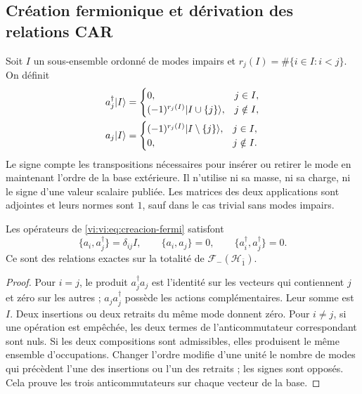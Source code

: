 \subsection{Création fermionique et dérivation des relations CAR}
\label{vi:vi:subsec:car-construccion}

Soit \(I\) un sous-ensemble ordonné de modes impairs et
\(r_j(I)=\#\{i\in I:i<j\}\). On définit
\begin{align}
 a_j^\dagger|I\rangle&=
 \begin{cases}
 0,&j\in I,\\
 (-1)^{r_j(I)}|I\cup\{j\}\rangle,&j\notin I,
 \end{cases}\notag\\
 a_j|I\rangle&=
 \begin{cases}
 (-1)^{r_j(I)}|I\setminus\{j\}\rangle,&j\in I,\\
 0,&j\notin I.
 \end{cases}
 \label{vi:vi:eq:creacion-fermi}
\end{align}
Le signe compte les transpositions nécessaires pour insérer ou retirer
le mode en maintenant l'ordre de la base extérieure. Il n'utilise ni sa masse,
ni sa charge, ni le signe d'une valeur scalaire publiée. Les matrices des
deux applications sont adjointes et leurs normes sont \(1\), sauf dans le
cas trivial sans modes impairs.

\begin{theorem}
\label{vi:vi:thm:car-construidas}
Les opérateurs de \eqref{vi:vi:eq:creacion-fermi} satisfont
\[
 \{a_i,a_j^\dagger\}=\delta_{ij}I,\qquad
 \{a_i,a_j\}=0,\qquad
 \{a_i^\dagger,a_j^\dagger\}=0.
\]
Ce sont des relations exactes sur la totalité de
\(\mathcal F_-(\mathcal H_{\bar1})\).
\end{theorem}
\begin{proof}
Pour \(i=j\), le produit \(a_j^\dagger a_j\) est l’identité
sur les vecteurs qui contiennent \(j\) et zéro sur les autres ;
\(a_ja_j^\dagger\) possède les actions complémentaires. Leur somme
est \(I\). Deux insertions ou deux retraits du même mode donnent zéro.
Pour \(i\ne j\), si une opération est empêchée, les deux termes
de l’anticommutateur correspondant sont nuls. Si les deux compositions
sont admissibles, elles produisent le même ensemble d’occupations. Changer
l’ordre modifie d’une unité le nombre de modes qui précèdent
l’une des insertions ou l’un des retraits ; les signes sont opposés. Cela
prouve les trois anticommutateurs sur chaque vecteur de la base.
\end{proof}

